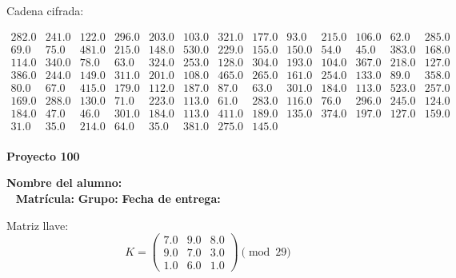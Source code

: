 \documentclass[12pt]{article}
\begin{document}
Cadena cifrada:
\begin{center}
$\begin{array}{lllllllllllll}
282.0 & 241.0 & 122.0 & 296.0 & 203.0 & 103.0 & 321.0 & 177.0 & 93.0 & 215.0 & 106.0 & 62.0 & 285.0\\
69.0 & 75.0 & 481.0 & 215.0 & 148.0 & 530.0 & 229.0 & 155.0 & 150.0 & 54.0 & 45.0 & 383.0 & 168.0\\
114.0 & 340.0 & 78.0 & 63.0 & 324.0 & 253.0 & 128.0 & 304.0 & 193.0 & 104.0 & 367.0 & 218.0 & 127.0\\
386.0 & 244.0 & 149.0 & 311.0 & 201.0 & 108.0 & 465.0 & 265.0 & 161.0 & 254.0 & 133.0 & 89.0 & 358.0\\
80.0 & 67.0 & 415.0 & 179.0 & 112.0 & 187.0 & 87.0 & 63.0 & 301.0 & 184.0 & 113.0 & 523.0 & 257.0\\
169.0 & 288.0 & 130.0 & 71.0 & 223.0 & 113.0 & 61.0 & 283.0 & 116.0 & 76.0 & 296.0 & 245.0 & 124.0\\
184.0 & 47.0 & 46.0 & 301.0 & 184.0 & 113.0 & 411.0 & 189.0 & 135.0 & 374.0 & 197.0 & 127.0 & 159.0\\
31.0 & 35.0 & 214.0 & 64.0 & 35.0 & 381.0 & 275.0 & 145.0\\
\end{array}$
\end{center}

\newpage


\textbf{Proyecto 100}

\textbf{Nombre del alumno:} \underline{\hspace{13cm}}\\\
\vspace{1cm}
\textbf{Matrícula:} \underline{\hspace{4cm}} \hspace{1cm}
\textbf{Grupo:} \underline{\hspace{2cm}}
\textbf{Fecha de entrega:} \underline{\hspace{2cm}}

\medskip

Matriz llave:
\[
K = \begin{pmatrix}
7.0 & 9.0 & 8.0\\
9.0 & 7.0 & 3.0\\
1.0 & 6.0 & 1.0
\end{pmatrix} \pmod{29}
\]
\end{document}

